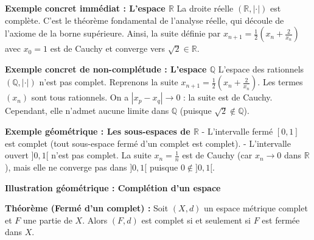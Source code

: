 \documentclass[11pt,a4paper]{article}
\begin{document}
\textbf{Exemple concret immédiat : L'espace $\mathbb{R}$}
La droite réelle $(\mathbb{R}, |\cdot|)$ est complète. C'est le théorème fondamental de l'analyse réelle, qui découle de l'axiome de la borne supérieure. Ainsi, la suite définie par $x_{n+1} = \frac{1}{2}(x_n + \frac{2}{x_n})$ avec $x_0 = 1$ est de Cauchy et converge vers $\sqrt{2} \in \mathbb{R}$.

\textbf{Exemple concret de non-complétude : L'espace $\mathbb{Q}$}
L'espace des rationnels $(\mathbb{Q}, |\cdot|)$ n'est pas complet. Reprenons la suite $x_{n+1} = \frac{1}{2}(x_n + \frac{2}{x_n})$. Les termes $(x_n)$ sont tous rationnels. On a $|x_p - x_q| \to 0$ : la suite est de Cauchy. Cependant, elle n'admet aucune limite dans $\mathbb{Q}$ (puisque $\sqrt{2} \notin \mathbb{Q}$).

\textbf{Exemple géométrique : Les sous-espaces de $\mathbb{R}$}
- L'intervalle fermé $[0, 1]$ est complet (tout sous-espace fermé d'un complet est complet).
- L'intervalle ouvert $]0, 1[$ n'est pas complet. La suite $x_n = \frac{1}{n}$ est de Cauchy (car $x_n \to 0$ dans $\mathbb{R}$), mais elle ne converge pas dans $]0, 1[$ puisque $0 \notin ]0, 1[$.

\textbf{Illustration géométrique : Complétion d'un espace}
\begin{center}
\end{center}

\textbf{Théorème (Fermé d'un complet) :}
Soit $(X, d)$ un espace métrique complet et $F$ une partie de $X$.
Alors $(F, d)$ est complet si et seulement si $F$ est fermée dans $X$.
\end{document}

